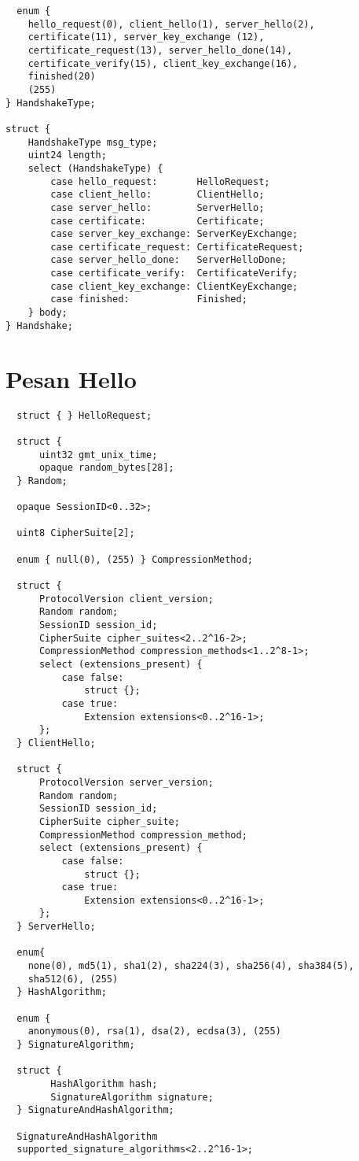 \begin{verbatim}
  enum {
    hello_request(0), client_hello(1), server_hello(2),
    certificate(11), server_key_exchange (12),
    certificate_request(13), server_hello_done(14),
    certificate_verify(15), client_key_exchange(16),
    finished(20)
    (255)
} HandshakeType;

struct {
    HandshakeType msg_type;
    uint24 length;
    select (HandshakeType) {
        case hello_request:       HelloRequest;
        case client_hello:        ClientHello;
        case server_hello:        ServerHello;
        case certificate:         Certificate;
        case server_key_exchange: ServerKeyExchange;
        case certificate_request: CertificateRequest;
        case server_hello_done:   ServerHelloDone;
        case certificate_verify:  CertificateVerify;
        case client_key_exchange: ClientKeyExchange;
        case finished:            Finished;
    } body;
} Handshake;

\end{verbatim}

\section{Pesan Hello}

\begin{verbatim}
  struct { } HelloRequest;

  struct {
      uint32 gmt_unix_time;
      opaque random_bytes[28];
  } Random;

  opaque SessionID<0..32>;

  uint8 CipherSuite[2];

  enum { null(0), (255) } CompressionMethod;

  struct {
      ProtocolVersion client_version;
      Random random;
      SessionID session_id;
      CipherSuite cipher_suites<2..2^16-2>;
      CompressionMethod compression_methods<1..2^8-1>;
      select (extensions_present) {
          case false:
              struct {};
          case true:
              Extension extensions<0..2^16-1>;
      };
  } ClientHello;

  struct {
      ProtocolVersion server_version;
      Random random;
      SessionID session_id;
      CipherSuite cipher_suite;
      CompressionMethod compression_method;
      select (extensions_present) {
          case false:
              struct {};
          case true:
              Extension extensions<0..2^16-1>;
      };
  } ServerHello;

  enum{
    none(0), md5(1), sha1(2), sha224(3), sha256(4), sha384(5),
    sha512(6), (255)
  } HashAlgorithm;

  enum {
    anonymous(0), rsa(1), dsa(2), ecdsa(3), (255)
  } SignatureAlgorithm;

  struct {
        HashAlgorithm hash;
        SignatureAlgorithm signature;
  } SignatureAndHashAlgorithm;

  SignatureAndHashAlgorithm
  supported_signature_algorithms<2..2^16-1>;
\end{verbatim}

